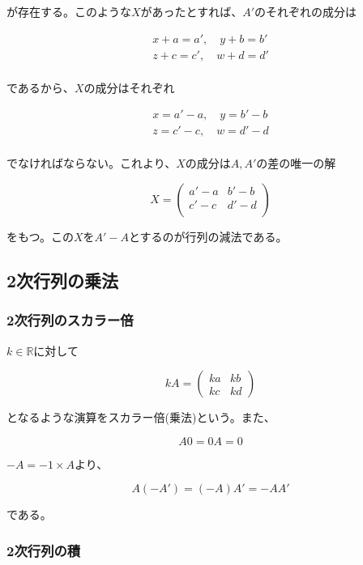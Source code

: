 \documentclass[dvipdfmx,autodetect-engine]{jsarticle}
\theoremstyle{definition}
\begin{document}
が存在する。このような$X$があったとすれば、$A'$のそれぞれの成分は

\begin{eqnarray*}
x + a = a', \quad y + b = b' \\
z + c = c', \quad w + d = d' \\
\end{eqnarray*}

であるから、$X$の成分はそれぞれ

\begin{eqnarray*}
x = a' - a, \quad y = b' - b \\
z = c' - c, \quad w = d' - d \\
\end{eqnarray*}

でなければならない。これより、$X$の成分は$A, A'$の差の唯一の解


$$
X = \begin{pmatrix}
a' - a & b' - b \\
c' - c & d' - d \\
\end{pmatrix}
$$

をもつ。この$X$を$A'-A$とするのが行列の減法である。

\subsection{2次行列の乗法}\label{subsubsection:matrixMultiple}

\subsubsection{2次行列のスカラー倍}

$k \in \mathbb{R}$に対して

$$
kA = \begin{pmatrix}
ka & kb \\
kc & kd
\end{pmatrix}
$$

となるような演算をスカラー倍(乗法)という。また、

$$
A0 = 0A = 0
$$

$-A = -1 \times A$より、

$$
A(-A') = (-A)A' = -AA'
$$

である。

\subsubsection{2次行列の積}
\end{document}

